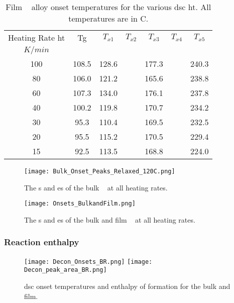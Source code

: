 \documentclass[a4paper,12pt,oneside]{article}%
\begin{document}
\begin{table}[h]
	\centering
	\begin{tabular}{ c c c c c c c }
		\toprule
		Heating Rate \acrshort{ht} & \acrshort{Tg} & $T_{x1}$ & $T_{x2}$ & $T_{x3}$ & $T_{x4}$ & $T_{x5}$ \\ 
		$K/min$ & & & & & & \\
		\midrule
		100 & 108.5 & 128.6 &  & 177.3 &  & 240.3 \\
		80  & 106.0 & 121.2 &  & 165.6 &  & 238.8 \\
		60  & 107.3 & 134.0 &  & 176.1 &  & 237.8 \\
		40  & 100.2 & 119.8 &  & 170.7 &  & 234.2 \\
		30  & 95.3  & 110.4 &  & 169.5 &  & 232.5 \\
		20  & 95.5  & 115.2 &  & 170.5 &  & 229.4 \\
		15  & 92.5  & 113.5 &  & 168.8 &  & 224.0 \\
		\bottomrule
	\end{tabular}
	\caption{Film \MgZnCa~ alloy onset temperatures for the various \acrshort{dsc}  \acrshort{ht}. All temperatures are in \degree C.}
	\label{tab:FilmOnsets}
\end{table}

\begin{figure}[b]
	\centering
	\texttt{[image: Bulk\_Onset\_Peaks\_Relaxed\_120C.png]}
	\caption[Table of contents Capition]{The \Tg s and \Tx es of the bulk \MgZnCa~ at all heating rates. }%
	\label{fig:DSC_Onsets_Bulk}
\end{figure}

\begin{figure}[b]
	\centering
	\texttt{[image: Onsets\_BulkandFilm.png]}
	\caption[Table of contents Capition]{The \Tg s and \Tx es of the bulk and film \MgZnCa~ at all heating rates. }%
	\label{fig:DSC_Onsets_BulkFilm}
\end{figure}

\subsubsection{Reaction enthalpy}

\begin{figure}[b]
	\centering
	\texttt{[image: Decon\_Onsets\_BR.png]}
	\medskip
	\texttt{[image: Decon\_peak\_area\_BR.png]}
	\caption{\acrshort{dsc} onset temperatures and enthalpy of formation for the bulk and film.}
	\label{fig:DSC_Decon}
\end{figure}
\end{document}
